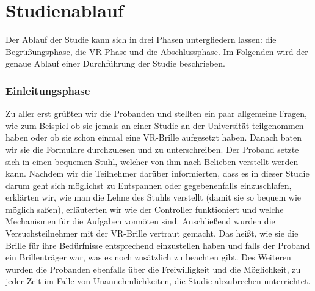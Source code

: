 \section{Studienablauf}

Der Ablauf der Studie kann sich in drei Phasen untergliedern lassen: die Begrüßungsphase, die VR-Phase und die Abschlussphase. Im Folgenden wird der genaue Ablauf einer Durchführung der Studie beschrieben.

\subsubsection{Einleitungsphase}
Zu aller erst grüßten wir die Probanden und stellten ein paar allgemeine Fragen, wie zum Beispiel ob sie jemals an einer Studie an der Universität teilgenommen haben oder ob sie schon einmal eine VR-Brille aufgesetzt haben. Danach baten wir sie die Formulare durchzulesen und zu unterschreiben. Der Proband setzte sich in einen bequemen Stuhl, welcher von ihm nach Belieben verstellt werden kann. Nachdem wir die Teilnehmer darüber informierten, dass es in dieser Studie darum geht sich möglichst zu Entspannen oder gegebenenfalls einzuschlafen, erklärten wir, wie man die Lehne des Stuhls verstellt (damit sie so bequem wie möglich saßen), erläuterten wir wie der Controller funktioniert und welche Mechanismen für die Aufgaben vonnöten sind. Anschließend wurden die Versuchsteilnehmer mit der VR-Brille vertraut gemacht. Das heißt, wie sie die Brille für ihre Bedürfnisse entsprechend einzustellen haben und falls der Proband ein Brillenträger war, was es noch zusätzlich zu beachten gibt.
Des Weiteren wurden die Probanden ebenfalls über die Freiwilligkeit und die Möglichkeit, zu jeder Zeit im Falle von Unannehmlichkeiten, die Studie abzubrechen unterrichtet.

